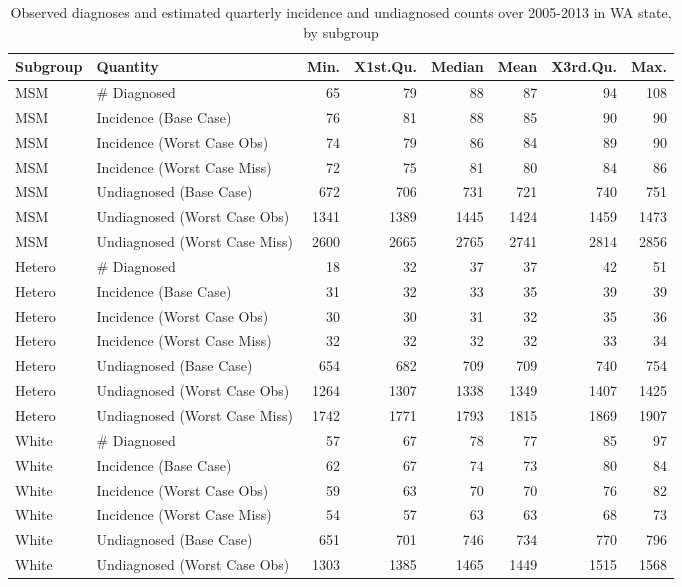 \documentclass{article}\usepackage[]{graphicx}\usepackage[]{color}
\begin{document}
\begin{table}[ht]
\centering
\caption{Observed diagnoses and estimated quarterly incidence and undiagnosed counts over 2005-2013 in WA state, by subgroup} 
\label{tab:res_subgroup}
{\small
\begin{tabular}{llrrrrrr}
  \hline
Subgroup & Quantity & Min. & X1st.Qu. & Median & Mean & X3rd.Qu. & Max. \\ 
  \hline
MSM & \# Diagnosed & 65 & 79 & 88 & 87 & 94 & 108 \\ 
  MSM & Incidence (Base Case) & 76 & 81 & 88 & 85 & 90 & 90 \\ 
  MSM & Incidence (Worst Case Obs) & 74 & 79 & 86 & 84 & 89 & 90 \\ 
  MSM & Incidence (Worst Case Miss) & 72 & 75 & 81 & 80 & 84 & 86 \\ 
  MSM & Undiagnosed (Base Case) & 672 & 706 & 731 & 721 & 740 & 751 \\ 
  MSM & Undiagnosed (Worst Case Obs) & 1341 & 1389 & 1445 & 1424 & 1459 & 1473 \\ 
  MSM & Undiagnosed (Worst Case Miss) & 2600 & 2665 & 2765 & 2741 & 2814 & 2856 \\ 
  Hetero & \# Diagnosed & 18 & 32 & 37 & 37 & 42 & 51 \\ 
  Hetero & Incidence (Base Case) & 31 & 32 & 33 & 35 & 39 & 39 \\ 
  Hetero & Incidence (Worst Case Obs) & 30 & 30 & 31 & 32 & 35 & 36 \\ 
  Hetero & Incidence (Worst Case Miss) & 32 & 32 & 32 & 32 & 33 & 34 \\ 
  Hetero & Undiagnosed (Base Case) & 654 & 682 & 709 & 709 & 740 & 754 \\ 
  Hetero & Undiagnosed (Worst Case Obs) & 1264 & 1307 & 1338 & 1349 & 1407 & 1425 \\ 
  Hetero & Undiagnosed (Worst Case Miss) & 1742 & 1771 & 1793 & 1815 & 1869 & 1907 \\ 
  White & \# Diagnosed & 57 & 67 & 78 & 77 & 85 & 97 \\ 
  White & Incidence (Base Case) & 62 & 67 & 74 & 73 & 80 & 84 \\ 
  White & Incidence (Worst Case Obs) & 59 & 63 & 70 & 70 & 76 & 82 \\ 
  White & Incidence (Worst Case Miss) & 54 & 57 & 63 & 63 & 68 & 73 \\ 
  White & Undiagnosed (Base Case) & 651 & 701 & 746 & 734 & 770 & 796 \\ 
  White & Undiagnosed (Worst Case Obs) & 1303 & 1385 & 1465 & 1449 & 1515 & 1568 \\ 

\end{tabular}}
\end{table}
\end{document}
